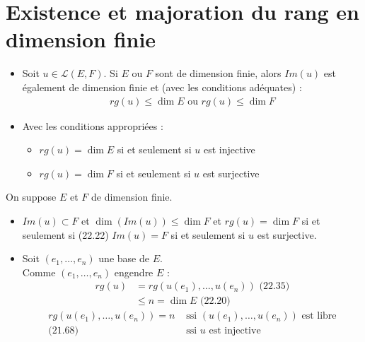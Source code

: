 \documentclass[../main.tex]{subfiles}
\begin{document}
\section{Existence et majoration du rang en dimension finie}
\begin{tcolorbox}[title=Propostion 22.36, title filled=false, colframe=lightblue, colback=lightblue!10!white]
    \begin{itemize}
        \item Soit $u\in \mathcal{L}(E, F)$. Si $E$ ou $F$ sont de dimension finie, alors $Im(u)$ est également de dimension finie et (avec les conditions adéquates) : 
        \begin{align*}
            rg(u) \leq \dim E \text{ ou } rg(u) \leq \dim F
        \end{align*}
        \item Avec les conditions appropriées : 
        \begin{itemize}
            \item $rg(u) = \dim E$ si et seulement si $u$ est injective
            \item $rg(u) = \dim F$ si et seulement si $u$ est surjective
        \end{itemize}
    \end{itemize}
\end{tcolorbox}

\noindent On suppose $E$ et $F$ de dimension finie.
\begin{itemize}
    \item $Im(u) \subset F$ et $\dim(Im(u)) \leq \dim F$ et $rg(u) = \dim F$ si et seulement si (22.22) $Im(u) = F$ si et seulement si $u$ est surjective.
    \item Soit $(e_1, \ldots, e_n)$ une base de $E$. \\
    Comme $(e_1, \ldots, e_n)$ engendre $E$ : 
    \begin{align*}
        rg(u) &= rg(u(e_1), \ldots, u(e_n)) \text{ (22.35)} \\
        &\leq n = \dim E \text{ (22.20)}
    \end{align*}
    \begin{align*}
        rg(u(e_1), \ldots, u(e_n)) = n &\text{ ssi } (u(e_1), \ldots, u(e_n)) \text{ est libre} \\
        \text{(21.68)} &\text{ ssi } u \text{ est injective} \\
    \end{align*}
\end{itemize}
\end{document}
